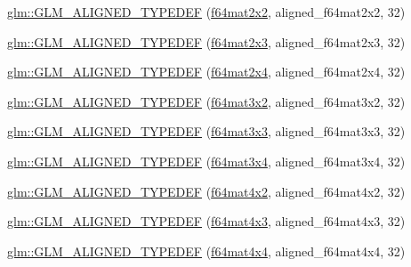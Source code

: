 \begin{DoxyCompactItemize}
\item 
\hyperlink{group__gtx__type__aligned_gadbd2c639c03de1c3e9591b5a39f65559}{glm\+::\+G\+L\+M\+\_\+\+A\+L\+I\+G\+N\+E\+D\+\_\+\+T\+Y\+P\+E\+D\+EF} (\hyperlink{group__gtc__type__precision_ga1e14d8b4e18898be51cd719fda213dcc}{f64mat2x2}, aligned\+\_\+f64mat2x2, 32)
\item 
\hyperlink{group__gtx__type__aligned_gab059d7b9fe2094acc563b7223987499f}{glm\+::\+G\+L\+M\+\_\+\+A\+L\+I\+G\+N\+E\+D\+\_\+\+T\+Y\+P\+E\+D\+EF} (\hyperlink{group__gtc__type__precision_ga6d0196bded514d55e26e0f68dd38b37b}{f64mat2x3}, aligned\+\_\+f64mat2x3, 32)
\item 
\hyperlink{group__gtx__type__aligned_gabbc811d1c52ed2b8cfcaff1378f75c69}{glm\+::\+G\+L\+M\+\_\+\+A\+L\+I\+G\+N\+E\+D\+\_\+\+T\+Y\+P\+E\+D\+EF} (\hyperlink{group__gtc__type__precision_gaf18b9f693f2ef743d93c9afd5cfbe229}{f64mat2x4}, aligned\+\_\+f64mat2x4, 32)
\item 
\hyperlink{group__gtx__type__aligned_ga9ddf5212777734d2fd841a84439f3bdf}{glm\+::\+G\+L\+M\+\_\+\+A\+L\+I\+G\+N\+E\+D\+\_\+\+T\+Y\+P\+E\+D\+EF} (\hyperlink{group__gtc__type__precision_ga0039ae03558b5242466f4c344c3c7d65}{f64mat3x2}, aligned\+\_\+f64mat3x2, 32)
\item 
\hyperlink{group__gtx__type__aligned_gad1dda32ed09f94bfcf0a7d8edfb6cf13}{glm\+::\+G\+L\+M\+\_\+\+A\+L\+I\+G\+N\+E\+D\+\_\+\+T\+Y\+P\+E\+D\+EF} (\hyperlink{group__gtc__type__precision_gab272e67eb87cc1e8233237480c2aa8d2}{f64mat3x3}, aligned\+\_\+f64mat3x3, 32)
\item 
\hyperlink{group__gtx__type__aligned_ga5875e0fa72f07e271e7931811cbbf31a}{glm\+::\+G\+L\+M\+\_\+\+A\+L\+I\+G\+N\+E\+D\+\_\+\+T\+Y\+P\+E\+D\+EF} (\hyperlink{group__gtc__type__precision_ga36436dae85fc187d4a20d68c4d660a10}{f64mat3x4}, aligned\+\_\+f64mat3x4, 32)
\item 
\hyperlink{group__gtx__type__aligned_ga41e82cd6ac07f912ba2a2d45799dcf0d}{glm\+::\+G\+L\+M\+\_\+\+A\+L\+I\+G\+N\+E\+D\+\_\+\+T\+Y\+P\+E\+D\+EF} (\hyperlink{group__gtc__type__precision_ga13dbaf75e4f1b18c35d2837067a14ce9}{f64mat4x2}, aligned\+\_\+f64mat4x2, 32)
\item 
\hyperlink{group__gtx__type__aligned_ga0892638d6ba773043b3d63d1d092622e}{glm\+::\+G\+L\+M\+\_\+\+A\+L\+I\+G\+N\+E\+D\+\_\+\+T\+Y\+P\+E\+D\+EF} (\hyperlink{group__gtc__type__precision_gab10a195a85f65da47bf70438f57a8a3c}{f64mat4x3}, aligned\+\_\+f64mat4x3, 32)
\item 
\hyperlink{group__gtx__type__aligned_ga912a16432608b822f1e13607529934c1}{glm\+::\+G\+L\+M\+\_\+\+A\+L\+I\+G\+N\+E\+D\+\_\+\+T\+Y\+P\+E\+D\+EF} (\hyperlink{group__gtc__type__precision_ga6b1ada50de2fc7d991138ab857fb2476}{f64mat4x4}, aligned\+\_\+f64mat4x4, 32)

\end{DoxyCompactItemize}
